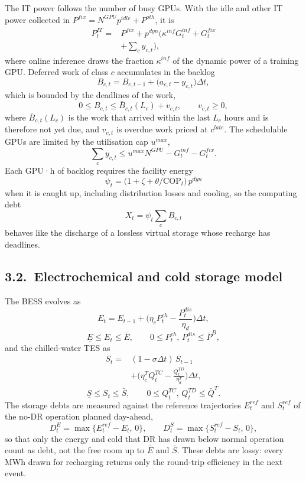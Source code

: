 \documentclass[a4paper,twocolumn,fleqn,10pt]{article}
\begin{document}
The IT power follows the number of busy GPUs. With the idle and other IT power collected in \(P^{fix}=N^{GPU}p^{idle}+P^{oth}\), it is \[\begin{aligned}P^{IT}_t={}&P^{fix}+p^{dyn}\Big(\kappa^{inf}G^{inf}_t+G^{fix}_t\\&+\textstyle\sum_{c}y_{c,t}\Big),\end{aligned} \tag{3}\] where online inference draws the fraction \(\kappa^{inf}\) of the dynamic power of a training GPU. Deferred work of class \(c\) accumulates in the backlog \[B_{c,t}=B_{c,t-1}+\big(a_{c,t}-y_{c,t}\big)\Delta t, \tag{4}\] which is bounded by the deadlines of the work, \[0\le B_{c,t}\le\bar B_{c,t}(L_c)+v_{c,t},\qquad v_{c,t}\ge0, \tag{5}\] where \(\bar B_{c,t}(L_c)\) is the work that arrived within the last \(L_c\) hours and is therefore not yet due, and \(v_{c,t}\) is overdue work priced at \(c^{late}\). The schedulable GPUs are limited by the utilisation cap \(u^{max}\), \[\textstyle\sum_c y_{c,t}\le u^{max}N^{GPU}-G^{inf}_t-G^{fix}_t . \tag{6}\] Each GPU·h of backlog requires the facility energy \[\psi_t=\big(1+\zeta+\theta/\mathrm{COP}_t\big)\,p^{dyn} \tag{7}\] when it is caught up, including distribution losses and cooling, so the computing debt \[X_t=\psi_t\textstyle\sum_cB_{c,t} \tag{8}\] behaves like the discharge of a lossless virtual storage whose recharge has deadlines.

\subsection*{3.2.~Electrochemical and cold storage model}

The BESS evolves as \[E_t=E_{t-1}+\Big(\eta_cP^{ch}_t-\frac{P^{dis}_t}{\eta_d}\Big)\Delta t, \tag{9}\] \[\underline E\le E_t\le\bar E,\qquad 0\le P^{ch}_t,\,P^{dis}_t\le\bar P^{B}, \tag{10}\] and the chilled-water TES as \[\begin{aligned}S_t={}&(1-\sigma\Delta t)\,S_{t-1}\\&+\Big(\eta^T_cQ^{TC}_t-\frac{Q^{TD}_t}{\eta^T_d}\Big)\Delta t,\end{aligned} \tag{11}\] \[\underline S\le S_t\le\bar S,\qquad 0\le Q^{TC}_t,\,Q^{TD}_t\le\bar Q^{T}. \tag{12}\] The storage debts are measured against the reference trajectories \(E^{ref}_t\) and \(S^{ref}_t\) of the no-DR operation planned day-ahead, \[D^E_t=\max\{E^{ref}_t-E_t,\,0\},\qquad D^S_t=\max\{S^{ref}_t-S_t,\,0\}, \tag{13}\] so that only the energy and cold that DR has drawn below normal operation count as debt, not the free room up to \(\bar E\) and \(\bar S\). These debts are lossy: every MWh drawn for recharging returns only the round-trip efficiency in the next event.
\end{document}
